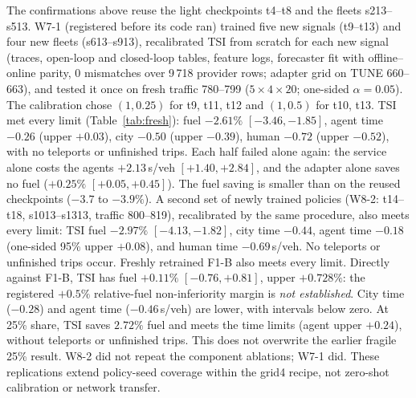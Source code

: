 The confirmations above reuse the light checkpoints t4--t8 and the fleets s213--s513. W7-1 (registered before its code ran) trained five
new signals (t9--t13) and four new fleets (s613--s913), recalibrated TSI from scratch for each new signal (traces, open-loop and closed-loop
tables, feature logs, forecaster fit with offline--online parity, 0 mismatches over 9\,718 provider rows; adapter grid on TUNE 660--663),
and tested it once on fresh traffic 780--799 ($5\times4\times20$; one-sided $\alpha=0.05$). The calibration chose $(1,0.25)$ for t9, t11,
t12 and $(1,0.5)$ for t10, t13. TSI met every limit (Table~\ref{tab:fresh}): fuel $-2.61\%$ $[-3.46,-1.85]$, agent time $-0.26$ (upper
$+0.03$), city $-0.50$ (upper $-0.39$), human $-0.72$ (upper $-0.52$), with no teleports or unfinished trips. Each half failed alone again:
the service alone costs the agents $+2.13$\,s/veh $[+1.40,+2.84]$, and the adapter alone saves no fuel ($+0.25\%$ $[+0.05,+0.45]$). The
fuel saving is smaller than on the reused checkpoints ($-3.7$ to $-3.9\%$). A second set of newly trained policies (W8-2: t14--t18, s1013--s1313, traffic 800--819), recalibrated by the same procedure, also meets every limit: TSI fuel $-2.97\%$ $[-4.13,-1.82]$, city time $-0.44$, agent time $-0.18$ (one-sided 95\% upper $+0.08$), and human time $-0.69$\,s/veh. No teleports or unfinished trips occur.
Freshly retrained F1-B also meets every limit. Directly against F1-B, TSI has fuel $+0.11\%$ $[-0.76,+0.81]$, upper $+0.728\%$: the registered $+0.5\%$ relative-fuel non-inferiority margin is \emph{not established}. City time ($-0.28$) and agent time ($-0.46$\,s/veh) are lower, with intervals below zero. At 25\% share, TSI saves $2.72\%$ fuel and meets the time limits (agent upper $+0.24$), without teleports or unfinished trips. This does not overwrite the earlier fragile 25\% result. W8-2 did not repeat the component ablations; W7-1 did. These replications extend policy-seed coverage within the grid4 recipe, not zero-shot calibration or network transfer.
\begin{table}[t]\centering\footnotesize\setlength{\tabcolsep}{2.5pt}
\caption{Fresh-policy replication W7-1: new signals t9--t13 $\times$ new fleets s613--s913 $\times$ fresh traffic 780--799, TSI
recalibrated from scratch. Differences against R with 95\% intervals; one-sided upper bounds at $\alpha=0.05$ in parentheses.}\label{tab:fresh}
\end{table}
